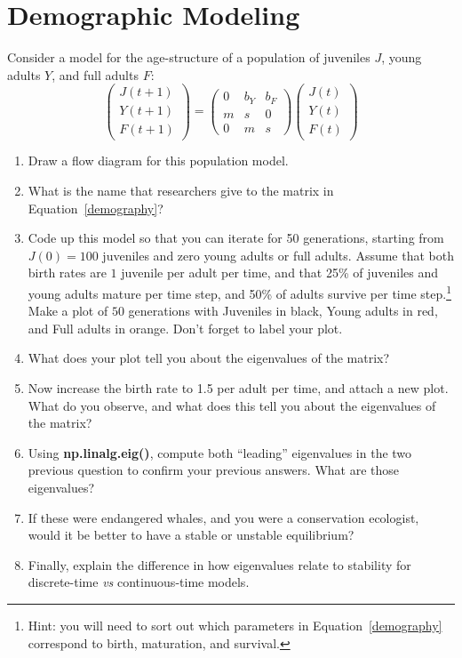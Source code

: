 \documentclass[11pt,onecolumn,superscriptaddress,notitlepage]{article}
\begin{document}
\clearpage
\section*{Demographic Modeling}

Consider a model for the age-structure of a population of juveniles $J$, young adults $Y$, and full adults $F$:
\begin{equation}
	\begin{pmatrix}
		J(t+1) \\ Y(t+1) \\ F(t+1)
	\end{pmatrix}
	= 
	\begin{pmatrix}
		0 & b_Y & b_F \\ 
		m & s & 0 \\
		0 & m & s
	\end{pmatrix}
	\begin{pmatrix}
		J(t) \\ Y(t) \\ F(t)
	\end{pmatrix}
	\label{demography}
\end{equation}

\begin{enumerate}[resume]
	\item Draw a flow diagram for this population model.
	\item What is the name that researchers give to the matrix in Equation~\eqref{demography}?
	\item Code up this model so that you can iterate for 50 generations, starting from $J(0)=100$ juveniles and zero young adults or full adults. Assume that both birth rates are $1$ juvenile per adult per time, and that 25\% of juveniles and young adults mature per time step, and 50\% of adults survive per time step.\footnote{Hint: you will need to sort out which parameters in Equation~\eqref{demography} correspond to birth, maturation, and survival.} Make a plot of $50$ generations with Juveniles in black, Young adults in red, and Full adults in orange. Don't forget to label your plot.
	\item What does your plot tell you about the eigenvalues of the matrix?
	\item Now increase the birth rate to 1.5 per adult per time, and attach a new plot. What do you observe, and what does this tell you about the eigenvalues of the matrix? 
	\item Using {\bf np.linalg.eig()}, compute both ``leading'' eigenvalues in the two previous question to confirm your previous answers. What are those eigenvalues?
	\item If these were endangered whales, and you were a conservation ecologist, would it be better to have a stable or unstable equilibrium?
	\item Finally, explain the difference in how eigenvalues relate to stability for discrete-time {\it vs} continuous-time models. 
\end{enumerate}
\end{document}
